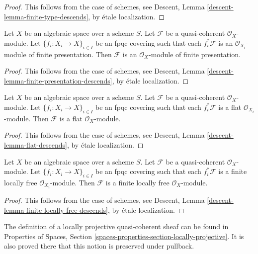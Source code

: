 \begin{proof}
This follows from the case of schemes, see
Descent, Lemma \ref{descent-lemma-finite-type-descends},
by \'etale localization.
\end{proof}

\begin{lemma}
\label{lemma-finite-presentation-descends}
Let $X$ be an algebraic space over a scheme $S$.
Let $\mathcal{F}$ be a quasi-coherent $\mathcal{O}_X$-module.
Let $\{f_i : X_i \to X\}_{i \in I}$ be an fpqc covering such that
each $f_i^*\mathcal{F}$ is an $\mathcal{O}_{X_i}$-module of finite
presentation. Then $\mathcal{F}$ is an $\mathcal{O}_X$-module
of finite presentation.
\end{lemma}

\begin{proof}
This follows from the case of schemes, see
Descent, Lemma \ref{descent-lemma-finite-presentation-descends},
by \'etale localization.
\end{proof}

\begin{lemma}
\label{lemma-flat-descends}
Let $X$ be an algebraic space over a scheme $S$.
Let $\mathcal{F}$ be a quasi-coherent $\mathcal{O}_X$-module.
Let $\{f_i : X_i \to X\}_{i \in I}$ be an fpqc covering such that
each $f_i^*\mathcal{F}$ is a flat $\mathcal{O}_{X_i}$-module.
Then $\mathcal{F}$ is a flat $\mathcal{O}_X$-module.
\end{lemma}

\begin{proof}
This follows from the case of schemes, see
Descent, Lemma \ref{descent-lemma-flat-descends},
by \'etale localization.
\end{proof}

\begin{lemma}
\label{lemma-finite-locally-free-descends}
Let $X$ be an algebraic space over a scheme $S$.
Let $\mathcal{F}$ be a quasi-coherent $\mathcal{O}_X$-module.
Let $\{f_i : X_i \to X\}_{i \in I}$ be an fpqc covering such that
each $f_i^*\mathcal{F}$ is a finite locally free $\mathcal{O}_{X_i}$-module.
Then $\mathcal{F}$ is a finite locally free $\mathcal{O}_X$-module.
\end{lemma}

\begin{proof}
This follows from the case of schemes, see
Descent, Lemma \ref{descent-lemma-finite-locally-free-descends},
by \'etale localization.
\end{proof}

\noindent
The definition of a locally projective quasi-coherent sheaf can be found in
Properties of Spaces, Section
\ref{spaces-properties-section-locally-projective}.
It is also proved there that this notion is preserved under pullback.

